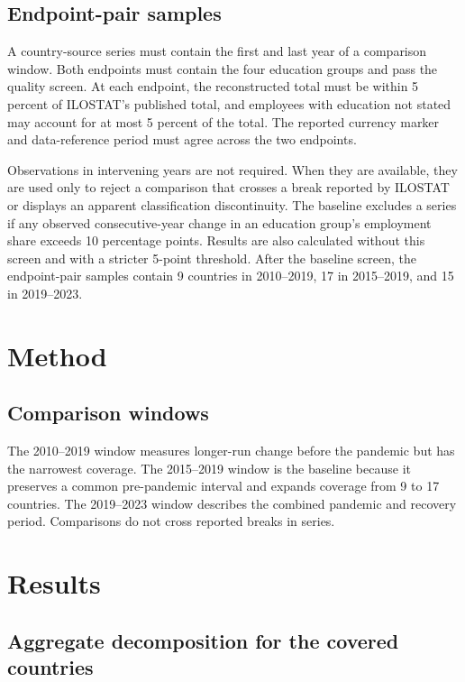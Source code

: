 \documentclass[11pt]{article}
\begin{document}
\subsection{Endpoint-pair samples}

A country-source series must contain the first and last year of a comparison
window. Both endpoints must contain the four education groups and pass the
quality screen. At each endpoint, the reconstructed total must be within 5
percent of ILOSTAT's published total, and employees with education not stated
may account for at most 5 percent of the total. The reported currency marker
and data-reference period must agree across the two endpoints.

Observations in intervening years are not required. When they are available,
they are used only to reject a comparison that crosses a break reported by
ILOSTAT or displays an apparent classification discontinuity. The baseline
excludes a series if any observed consecutive-year change in an education
group's employment share exceeds 10 percentage points. Results are also
calculated without this screen and with a stricter 5-point threshold. After
the baseline screen, the endpoint-pair samples contain 9 countries in
2010--2019, 17 in 2015--2019, and 15 in 2019--2023.

\section{Method}





\subsection{Comparison windows}

The 2010--2019 window measures longer-run change before the pandemic but has
the narrowest coverage. The 2015--2019 window is the baseline because it
preserves a common pre-pandemic interval and expands coverage from 9 to 17
countries. The 2019--2023 window describes the combined pandemic and recovery
period. Comparisons do not cross reported breaks in series.

\section{Results}

\subsection{Aggregate decomposition for the covered countries}
\end{document}
